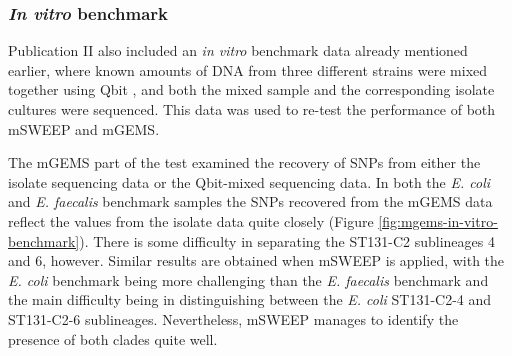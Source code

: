 \documentclass[officiallayout]{tktla}
\begin{document}
\pagebreak

\subsubsection{\textit{In vitro} benchmark}

Publication II also included an \textit{in vitro} benchmark data
already mentioned earlier, where known amounts of DNA from three
different strains were mixed together using Qbit
\citep{maklin_bacterial_2021}, and both the mixed sample and the
corresponding isolate cultures were sequenced. This data was used to
re-test the performance of both mSWEEP and mGEMS.

The mGEMS part of the test examined the recovery of SNPs from either
the isolate sequencing data or the Qbit-mixed sequencing data. In both
the \textit{E. coli} and \textit{E. faecalis} benchmark samples the
SNPs recovered from the mGEMS data reflect the values from the isolate
data quite closely (Figure \ref{fig:mgems-in-vitro-benchmark}). There
is some difficulty in separating the ST131-C2 sublineages 4 and 6,
however. Similar results are obtained when mSWEEP is applied, with the
\textit{E. coli} benchmark being more challenging than the
\textit{E. faecalis} benchmark and the main difficulty being in
distinguishing between the \textit{E. coli} ST131-C2-4 and ST131-C2-6
sublineages. Nevertheless, mSWEEP manages to identify the presence of
both clades quite well.
\end{document}
